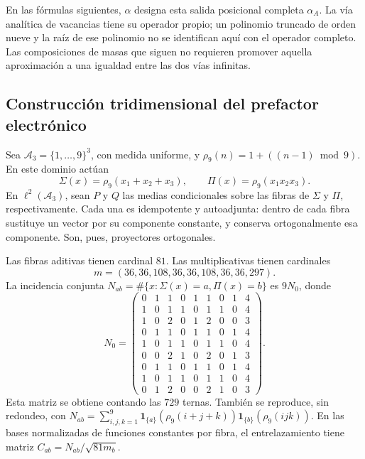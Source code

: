 En las fórmulas siguientes, \(\alpha\) designa esta salida posicional
completa \(\alpha_A\). La vía analítica de vacancias tiene su operador
propio; un polinomio truncado de orden nueve y la raíz de ese polinomio
no se identifican aquí con el operador completo. Las composiciones de
masas que siguen no requieren promover aquella aproximación a una
igualdad entre las dos vías infinitas.

\subsection{Construcción tridimensional del prefactor electrónico}
\label{vi:dep:prefactor}

Sea \(\mathcal A_3=\{1,\ldots,9\}^3\), con medida uniforme, y
\(\rho_9(n)=1+((n-1)\bmod9)\). En este dominio actúan
\[
 \Sigma(x)=\rho_9(x_1+x_2+x_3),\qquad
 \Pi(x)=\rho_9(x_1x_2x_3).
\]
En \(\ell^2(\mathcal A_3)\), sean \(P\) y \(Q\) las medias
condicionales sobre las fibras de \(\Sigma\) y \(\Pi\),
respectivamente. Cada una es idempotente y autoadjunta: dentro de cada
fibra sustituye un vector por su componente constante, y conserva
ortogonalmente esa componente. Son, pues, proyectores ortogonales.

Las fibras aditivas tienen cardinal \(81\). Las multiplicativas tienen
cardinales
\[
m=(36,36,108,36,36,108,36,36,297).
\]
La incidencia conjunta
\(N_{ab}=\#\{x:\Sigma(x)=a,\Pi(x)=b\}\) es \(9N_0\), donde
\begin{equation}
 N_0=\begin{pmatrix}
0&1&1&0&1&1&0&1&4\\1&0&1&1&0&1&1&0&4\\
1&0&2&0&1&2&0&0&3\\0&1&1&0&1&1&0&1&4\\
1&0&1&1&0&1&1&0&4\\0&0&2&1&0&2&0&1&3\\
0&1&1&0&1&1&0&1&4\\1&0&1&1&0&1&1&0&4\\
0&1&2&0&0&2&1&0&3
\end{pmatrix}.
 \label{vi:dep:incidencia-cubica}
\end{equation}
Esta matriz se obtiene contando las \(729\) ternas. También se
reproduce, sin redondeo, con
\(N_{ab}=\sum_{i,j,k=1}^9
\mathbf1_{\{a\}}(\rho_9(i+j+k))
\mathbf1_{\{b\}}(\rho_9(ijk))\).
En las bases normalizadas de funciones constantes por fibra, el
entrelazamiento tiene matriz \(C_{ab}=N_{ab}/\sqrt{81m_b}\).

